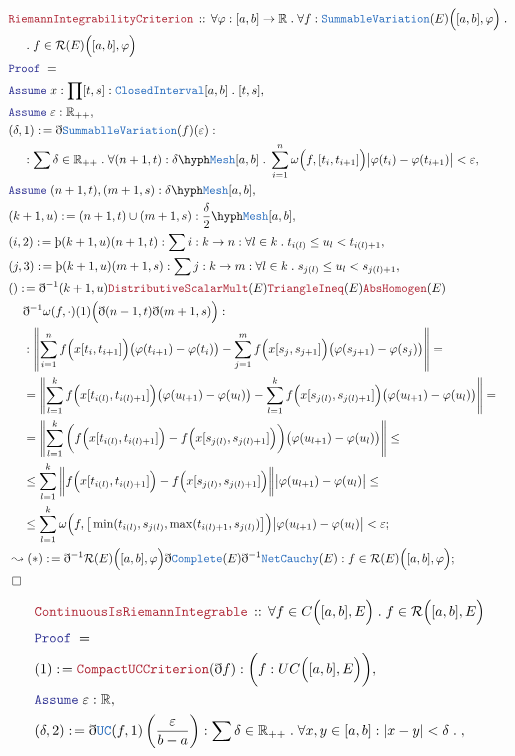 \documentclass[12pt]{scrartcl}
\newcommand{\TYPE}[1]{\textcolor{NavyBlue}{\mathtt{#1}}}
\newcommand{\LOGIC}[1]{\textcolor{Blue}{\mathtt{#1}}}
\newcommand{\THM}[1]{\textcolor{Maroon}{\mathtt{#1}}}
\renewcommand{\.}{\; . \;}
\newcommand{\de}{: \kern 0.1pc =}
\newcommand{\Theorem}[2]{& \THM{#1} \, :: \, #2 \\ & \Proof = \\ }
\newcommand{\NewLine}{\\ & \kern 1pc}
\newcommand{\Page}[1]{ \begin{align*} #1 \end{align*}   }
\newcommand{ \bd }{ \ByDef }
\newcommand{\Reals}{\mathbb{R} }
\newcommand{\Say}[3]{& #1 \de #2 : #3, \\}
\newcommand{\Conclude}[3]{& #1 \de #2 : #3; \\}
\newcommand{\DeriveConclude}[3]{& \leadsto #1 \de #2 : #3 ; \\}
\newcommand{\Assume}[2]{& \LOGIC{Assume} \;#1 : #2, \\}
\newcommand{\QED}{\; \square}
\newcommand{\EndProof}{& \QED \\}
\newcommand{\ByDef}{\eth}
\newcommand{\ByConstr}{\text{\thorn}}
\newcommand{\Proof}{\LOGIC{Proof} \; }
\begin{document}
\newpage
\Page{
	\Theorem{RiemannIntegrabilityCriterion}{\forall \varphi : [a,b] \to \Reals \. 
		\forall f : \TYPE{SummableVariation}(E)\Big( [a,b], \varphi \Big) \. 
		\NewLine \. f \in \mathcal{R}(E)\Big([a,b],\varphi\Big) }
	\Assume{x}{\prod [t,s] : \TYPE{ClosedInterval}[a,b] \. [t,s]}
	\Assume{\varepsilon}{\Reals_{++}}
	\Say{(\delta,1)}{\bd \TYPE{SummablleVariation}(f)(\varepsilon)}
	{
		\NewLine :
		\sum \delta \in \Reals_{++} \. \forall (n+1,t) : \delta\hyph \TYPE{Mesh}[a,b] \. 
		 \sum^n_{i=1} \omega\Big(f, [t_i,t_{i+1}] \Big) \big|  \varphi(t_{i}) - \varphi(t_{i+1}) \big| 
		 < \varepsilon} 
	\Assume{(n+1,t),(m+1,s)}{\delta \hyph \TYPE{Mesh}[a,b]}
	\Say{(k+1,u)}{(n+1,t) \cup (m+1,s)}{\frac{\delta}{2} \hyph \TYPE{Mesh}[a,b] }
	\Say{(i,2)}{\ByConstr(k+1,u)(n+1,t)}{\sum i : k \to n : \forall l \in k \.   t_{i(l)}\le u_l <  t_{i(l)+1}}
	\Say{(j,3)}{\ByConstr(k+1,u)(m+1,s)}{\sum j : k \to m : \forall l \in k \.   s_{j(l)}\le u_l <  s_{j(l)+1}}
	\Conclude{()}{ \bd^{-1}(k+1,u)\THM{DistributiveScalarMult}(E)\THM{TriangleIneq}(E) \THM{AbsHomogen}(E)
	\NewLine \bd^{-1}\omega(f,\cdot) (1) \Big(\bd (n-1,t)\bd(m+1,s)\Big) 
	}
	{
		\NewLine :
		\left\| \sum^n_{i=1} f\Big( x[t_i,t_{i+1}] \Big)\big(\varphi(t_{i + 1}) - \varphi(t_i)\big) 
		- \sum^m_{j=1} f\Big( x[s_j,s_{j+1}] \Big)\big(\varphi(s_{j + 1}) - \varphi(s_j)\big) \right\| 
		=\NewLine =
		\left\|  \sum^k_{l=1} f\Big( x[t_{i(l)},t_{i(l) +1}]\Big)\big(\varphi(u_{l+1}) - \varphi(u_l)\big)
		- \sum^k_{l=1} f\Big( x[s_{j(l)},s_{j(l) +1}]\Big)\big(\varphi(u_{l+1}) - \varphi(u_l)\big) \right\|
		= \NewLine = 
		\left\|  \sum^k_{l=1} \bigg( f\Big( x[t_{i(l)},t_{i(l)+1}]\Big) - f\Big( x[s_{j(l)},s_{j(l)+1}]\Big)\bigg)
		\big(\varphi(u_{l+1}) - \varphi(u_{l})\big) \right\|	
		\le \NewLine \le   
		\sum^k_{l=1} \bigg\| f\Big( x[t_{i(l)},t_{i(l)+1}]\Big) - f\Big( x[s_{j(l)},s_{j(l)+1}]\Big)\bigg\|
		\big|\varphi(u_{l+1}) - \varphi(u_{l})\big|
		\le \NewLine \le 
		\sum^k_{l=1} \omega\Big(f, \big[\min(t_{i(l)},s_{j(l)},\max(t_{i(l)+1},s_{j(l)})\big]\Big)
		\big|\varphi(u_{l+1}) - \varphi(u_l)  \big| < \varepsilon
	}
	\DeriveConclude{(*)}{\bd^{-1} \mathcal{R}(E)\Big( [a,b],\varphi \Big)  
		\bd \TYPE{Complete}(E)\bd^{-1}\TYPE{NetCauchy}(E)}
		{f \in \mathcal{R}(E)\Big([a,b],\varphi\Big)}
	\EndProof
}\Page{
	\Theorem{ContinuousIsRiemannIntegrable}{\forall f \in C\Big([a,b],E\Big) \. f \in \mathcal{R}\Big([a,b],E\Big) }
	\Say{ (1)   }{\THM{CompactUCCriterion}(\bd f)}{\bigg( f : UC\Big( [a,b], E \Big) \bigg)}
	\Assume{\varepsilon}{\Reals}
	\Say{(\delta,2)}{\bd \TYPE{UC}(f,1)\left( \frac{\varepsilon}{b-a} \right) }
	{ \sum \delta \in \Reals_{++} \. \forall x,y \in [a,b] : | x - y| < \delta \. 
}}
\end{document}

